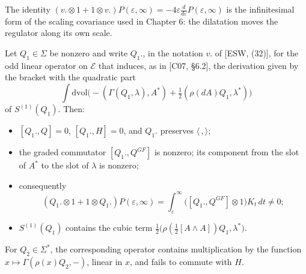 The identity $(v.\otimes1+1\otimes v.)P(\varepsilon,\infty)=-4\varepsilon\frac{d}{d\varepsilon}P(\varepsilon,\infty)$ is the infinitesimal form of the scaling covariance used in Chapter 6: the dilatation moves the regulator along its own scale.

\begin{proposition}
\label{prop:c7-susy}
Let $Q_1\in\Sigma$ be nonzero and write $Q_1.$, in the notation $v.$ of [ESW, (32)], for the odd linear operator on $\mathscr E$ that induces, as in [C07, §6.2], the derivation given by the bracket with the quadratic part
\[
\int\mathrm{dvol}\Big(-(\Gamma(Q_1,\lambda),A^*)+\tfrac12(\rho(dA)Q_1,\lambda^*)\Big)
\]
of $S^{(1)}(Q_1)$. Then:
\begin{itemize}
\item $[Q_1.,Q]=0$, $[Q_1.,H]=0$, and $Q_1.$ preserves $\langle\,,\rangle$;
\item the graded commutator $[Q_1.,Q^{GF}]$ is nonzero; its component from the slot of $A^*$ to the slot of $\lambda$ is nonzero;
\item consequently
\[
(Q_1.\otimes1+1\otimes Q_1.)P(\varepsilon,\infty)=\int_\varepsilon^\infty\big([Q_1.,Q^{GF}]\otimes1\big)K_t\,dt\neq0 ;
\]
\item $S^{(1)}(Q_1)$ contains the cubic term $\tfrac12\big(\rho(\tfrac12[A\wedge A])Q_1,\lambda^*\big)$.
\end{itemize}
For $Q_2\in\Sigma^*$, the corresponding operator contains multiplication by the function $x\mapsto\Gamma(\rho(x)Q_2,-)$, linear in $x$, and fails to commute with $H$.
\end{proposition}

